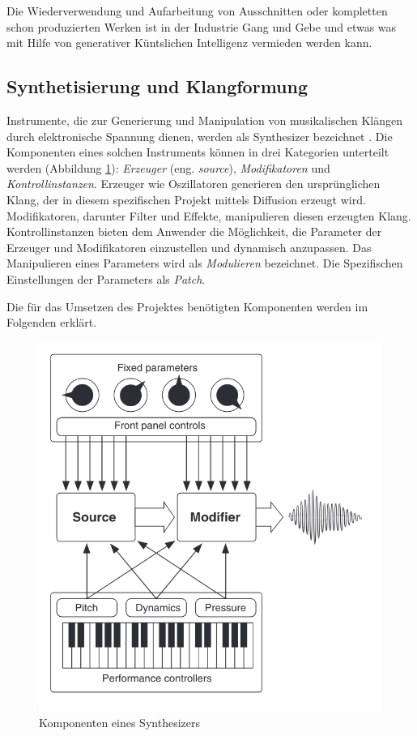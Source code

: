 \documentclass[
  a4paper,  %
  twoside,  %
  bibliography=totoc,
  headsepline,
  cleardoublepage=empty,
  parskip=half,
  draft=false
]{scrbook}
\begin{document}
Die Wiederverwendung und Aufarbeitung von Ausschnitten oder kompletten schon produzierten Werken ist in der Industrie Gang und Gebe und etwas was mit Hilfe von generativer Küntslichen Intelligenz vermieden werden kann. 

\subsection{Synthetisierung und Klangformung} \label{sec:synth+envelope}

Instrumente, die zur Generierung und Manipulation von musikalischen Klängen durch elektronische Spannung dienen, werden als Synthesizer bezeichnet \cite{dudenredaktion_synthesizer_nodate, pirkle_designing_2021}. Die Komponenten eines solchen Instruments können in drei Kategorien unterteilt werden (Abbildung \ref{fig:synth}): \emph{Erzeuger} (eng. \emph{source}), \emph{Modifikatoren} und \emph{Kontrollinstanzen}. Erzeuger wie Oszillatoren generieren den ursprünglichen Klang, der in diesem spezifischen Projekt mittels Diffusion erzeugt wird. Modifikatoren, darunter Filter und Effekte, manipulieren diesen erzeugten Klang. Kontrollinstanzen bieten dem Anwender die Möglichkeit, die Parameter der Erzeuger und Modifikatoren einzustellen und dynamisch anzupassen. Das Manipulieren eines Parameters wird als \emph{Modulieren} bezeichnet. Die Spezifischen Einstellungen der Parameters als \emph{Patch}. \cite{pirkle_designing_2021}   

Die für das Umsetzen des Projektes benötigten Komponenten werden im Folgenden erklärt. 

\begin{figure}[h]
  \centering
  \includegraphics[width=.5\textwidth]{graphics/synthstruc.png}
  \caption[Synth]{Komponenten eines Synthesizers \cite{russ_sound_2009}}
  \label{fig:synth}
\end{figure}
\end{document}
